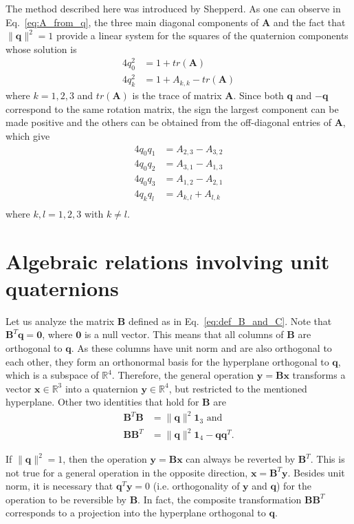 \documentclass[aip,jcp,reprint,amsmath,amssymb]{revtex4-1}
\newcommand{\mt}[1]{\boldsymbol{\mathbf{#1}}}           %
\newcommand{\vt}[1]{\boldsymbol{\mathbf{#1}}}           %
\newcommand{\tr}[1]{#1^T}                               %
\begin{document}
The method described here was introduced by Shepperd.\cite{Shepperd1978} As one can observe in Eq.~\ref{eq:A_from_q}, the three main diagonal components of $\mt A$ and the fact that $\lVert \vt q \lVert^2 = 1$ provide a linear system for the squares of the quaternion components whose solution is
\begin{align*}
4 q_0^2 &= 1 + tr(\mt A) \\
4 q_k^2 &= 1 + A_{k,k} - tr(\mt A)
\end{align*}
where $k = 1,2,3$ and $tr(\mt A)$ is the trace of matrix $\mt A$. Since both $\vt q$ and $- \vt q$ correspond to the same rotation matrix, the sign the largest component\cite{Shepperd1978} can be made positive and the others can be obtained from the off-diagonal entries of $\mt A$, which give
\begin{align*}
4 q_0 q_1 &= A_{2,3} - A_{3,2} \\
4 q_0 q_2 &= A_{3,1} - A_{1,3} \\
4 q_0 q_3 &= A_{1,2} - A_{2,1} \\
4 q_k q_l &= A_{k,l} + A_{l,k} \\
\end{align*}
where $k,l = 1,2,3$ with $k \neq l$.

\section{\label{sec:auxiliary_math}Algebraic relations involving unit quaternions}

Let us analyze the matrix $\mt B$ defined as in Eq.~\ref{eq:def_B_and_C}. Note that $\tr{\mt B}\vt q = \vt 0$, where $\vt 0$ is a null vector.\cite{Haug1989, Shuster1993, Dichmann1999} This means that all columns of $\mt B$ are orthogonal to $\vt q$. As these columns have unit norm and are also orthogonal to each other, they form an orthonormal basis for the hyperplane orthogonal to $\mt q$, which is a subspace of $\mathbb{R}^4$. Therefore, the general operation $\vt y = \mt B \vt x$ transforms a vector $\vt x \in \mathbb{R}^3$ into a quaternion $\vt y \in \mathbb{R}^4$, but restricted to the mentioned hyperplane. Other two identities that hold for $\mt B$ are\citep{Haug1989}
\begin{align*}
\tr{\mt B}\mt B &= \lVert \vt q \lVert ^2{\mt 1}_3 \text{ and} \\
\mt B\tr{\mt B} &= \lVert \vt q \lVert ^2{\mt 1}_4 - {\vt q}\tr{\vt q}.
\end{align*}

If $\lVert \vt q \lVert^2 = 1$, then the operation $\vt y = \mt B \vt x$ can always be reverted by $\tr{\mt B}$. This is not true for a general operation in the opposite direction, $\vt x = \tr{\mt B} \vt y$. Besides unit norm, it is necessary that $\tr{\vt q}\vt y = 0$ (i.e. orthogonality of $\vt y$ and $\vt q$) for the operation to be reversible by $\mt B$. In fact, the composite transformation $\mt B\tr{\mt B}$ corresponds to a projection into the hyperplane orthogonal to $\vt q$.\cite{Dichmann1999}
\end{document}
